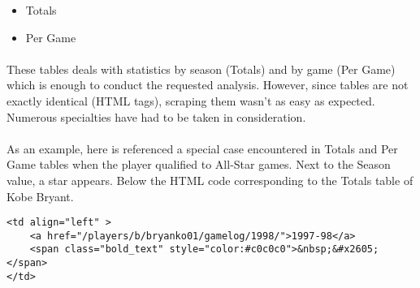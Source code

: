 \begin{itemize}
	\item Totals
	\item Per Game
\end{itemize}

\paragraph{}These tables deals with statistics by season (Totals) and by game (Per Game) which is enough to conduct the requested analysis. However, since tables are not exactly identical (HTML tags), scraping them wasn't as easy as expected. Numerous specialties have had to be taken in consideration.

\paragraph{}As an example, here is referenced a special case encountered in Totals and Per Game tables when the player qualified to All-Star games. Next to the Season value, a star appears. Below the HTML code corresponding to the Totals table of Kobe Bryant.

\begin{verbatim}
<td align="left" >
	<a href="/players/b/bryanko01/gamelog/1998/">1997-98</a>
	<span class="bold_text" style="color:#c0c0c0">&nbsp;&#x2605;</span>
</td>
\end{verbatim}

